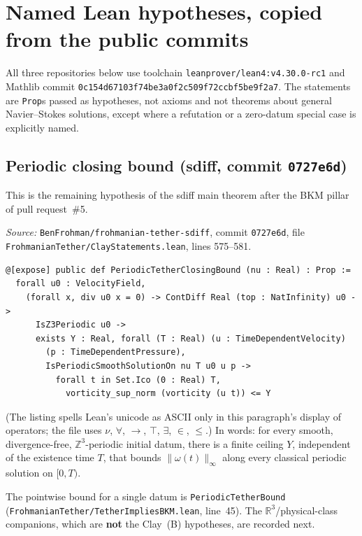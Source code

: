 \documentclass[11pt]{article}
\theoremstyle{plain}
\theoremstyle{definition}
\theoremstyle{remark}
\newcommand{\R}{\mathbb{R}}
\newcommand{\sdiffsha}{0727e6d}
\begin{document}
\section{Named Lean hypotheses, copied from the public commits}

All three repositories below use toolchain \texttt{leanprover/\hspace{0pt}lean4:v4.\hspace{0pt}30.\hspace{0pt}0-rc1} and Mathlib commit \texttt{0c154d67103f74be3a0f2c509f72ccbf5be9f2a7}. The statements are \texttt{Prop}s passed as hypotheses, not axioms and not theorems about general Navier--Stokes solutions, except where a refutation or a zero-datum special case is explicitly named.

\subsection{Periodic closing bound (sdiff, commit \texttt{\sdiffsha})}

This is the remaining hypothesis of the sdiff main theorem after the BKM pillar of pull request~\#5.

\textit{Source:} \texttt{BenFrohman/\hspace{0pt}frohmanian-tether-sdiff}, commit \texttt{\sdiffsha}, file \texttt{FrohmanianTether/\hspace{0pt}ClayStatements.\hspace{0pt}lean}, lines 575--581.
\begin{lstlisting}
@[expose] public def PeriodicTetherClosingBound (nu : Real) : Prop :=
  forall u0 : VelocityField,
    (forall x, div u0 x = 0) -> ContDiff Real (top : NatInfinity) u0 ->
      IsZ3Periodic u0 ->
      exists Y : Real, forall (T : Real) (u : TimeDependentVelocity)
        (p : TimeDependentPressure),
        IsPeriodicSmoothSolutionOn nu T u0 u p ->
          forall t in Set.Ico (0 : Real) T,
            vorticity_sup_norm (vorticity (u t)) <= Y
\end{lstlisting}
(The listing spells Lean's unicode as ASCII only in this paragraph's display of operators; the file uses \(\nu\), \(\forall\), \(\to\), \(\top\), \(\exists\), \(\in\), \(\le\).) In words: for every smooth, divergence-free, \(\mathbb{Z}^{3}\)-periodic initial datum, there is a finite ceiling \(Y\), independent of the existence time \(T\), that bounds \(\|\omega(t)\|_{\infty}\) along every classical periodic solution on \([0,T)\).

The pointwise bound for a single datum is \texttt{PeriodicTetherBound} (\texttt{FrohmanianTether/\hspace{0pt}TetherImpliesBKM.\hspace{0pt}lean}, line~45). The \(\R^{3}\)/physical-class companions, which are \textbf{not} the Clay~(B) hypotheses, are recorded next.
\end{document}
